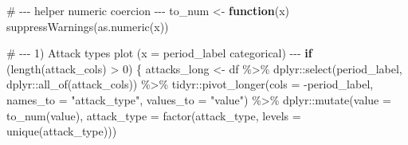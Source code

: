 \documentclass[
  letterpaper,
  DIV=11,
  numbers=noendperiod]{scrartcl}
\newenvironment{Shaded}{\begin{snugshade}}{\end{snugshade}}
\newcommand{\AttributeTok}[1]{\textcolor[rgb]{0.40,0.45,0.13}{#1}}
\newcommand{\CommentTok}[1]{\textcolor[rgb]{0.37,0.37,0.37}{#1}}
\newcommand{\ControlFlowTok}[1]{\textcolor[rgb]{0.00,0.23,0.31}{\textbf{#1}}}
\newcommand{\DecValTok}[1]{\textcolor[rgb]{0.68,0.00,0.00}{#1}}
\newcommand{\FunctionTok}[1]{\textcolor[rgb]{0.28,0.35,0.67}{#1}}
\newcommand{\NormalTok}[1]{\textcolor[rgb]{0.00,0.23,0.31}{#1}}
\newcommand{\OtherTok}[1]{\textcolor[rgb]{0.00,0.23,0.31}{#1}}
\newcommand{\SpecialCharTok}[1]{\textcolor[rgb]{0.37,0.37,0.37}{#1}}
\newcommand{\StringTok}[1]{\textcolor[rgb]{0.13,0.47,0.30}{#1}}
\begin{document}
\begin{Shaded}
\begin{Highlighting}[]
\CommentTok{\# {-}{-}{-} helper numeric coercion {-}{-}{-}}
\NormalTok{to\_num }\OtherTok{\textless{}{-}} \ControlFlowTok{function}\NormalTok{(x) }\FunctionTok{suppressWarnings}\NormalTok{(}\FunctionTok{as.numeric}\NormalTok{(x))}

\CommentTok{\# {-}{-}{-} 1) Attack types plot (x = period\_label categorical) {-}{-}{-}}
\ControlFlowTok{if}\NormalTok{ (}\FunctionTok{length}\NormalTok{(attack\_cols) }\SpecialCharTok{\textgreater{}} \DecValTok{0}\NormalTok{) \{}
\NormalTok{  attacks\_long }\OtherTok{\textless{}{-}}\NormalTok{ df }\SpecialCharTok{\%\textgreater{}\%}
\NormalTok{    dplyr}\SpecialCharTok{::}\FunctionTok{select}\NormalTok{(period\_label, dplyr}\SpecialCharTok{::}\FunctionTok{all\_of}\NormalTok{(attack\_cols)) }\SpecialCharTok{\%\textgreater{}\%}
\NormalTok{    tidyr}\SpecialCharTok{::}\FunctionTok{pivot\_longer}\NormalTok{(}\AttributeTok{cols =} \SpecialCharTok{{-}}\NormalTok{period\_label, }\AttributeTok{names\_to =} \StringTok{"attack\_type"}\NormalTok{, }\AttributeTok{values\_to =} \StringTok{"value"}\NormalTok{) }\SpecialCharTok{\%\textgreater{}\%}
\NormalTok{    dplyr}\SpecialCharTok{::}\FunctionTok{mutate}\NormalTok{(}\AttributeTok{value =} \FunctionTok{to\_num}\NormalTok{(value),}
                  \AttributeTok{attack\_type =} \FunctionTok{factor}\NormalTok{(attack\_type, }\AttributeTok{levels =} \FunctionTok{unique}\NormalTok{(attack\_type)))}
  

\end{Highlighting}
\end{Shaded}
\end{document}

